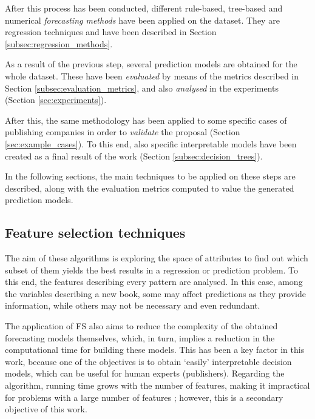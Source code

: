 \documentclass[a4paper,10pt,twocolumn,preprint,3p]{elsarticle}
\begin{document}
After this process has been conducted, different rule-based, tree-based and numerical \textit{forecasting methods} have been applied on the dataset. They are regression techniques and have been described in Section \ref{subsec:regression_methods}.

As a result of the previous step, several prediction models are obtained for the whole dataset. These have been \textit{evaluated} by means of the metrics described in Section \ref{subsec:evaluation_metrics}, and also \textit{analysed} in the experiments (Section \ref{sec:experiments}).

After this, the same methodology has been applied to some specific cases of publishing companies in order to \textit{validate} the proposal (Section \ref{sec:example_cases}). To this end, also specific interpretable models have been created as a final result of the work (Section \ref{subsec:decision_trees}). 

In the following sections, the main techniques to be applied on these steps are described, along with the evaluation metrics computed to value the generated prediction models.

\subsection{Feature selection techniques}
\label{subsec:fs_techniques}

The aim of these algorithms is exploring the space of attributes to find out 
which subset of them yields the best results in a regression or prediction 
problem. To this end, the features describing every pattern are analysed. 
In this case, among the variables describing a new book, some may affect 
predictions as they provide information, while others may not be necessary 
and even redundant.

The application of FS also aims to reduce the complexity of the obtained 
forecasting models themselves, which, in turn, implies a reduction in the 
computational time for building these models. This has been a key 
factor in this work, because one of the objectives is to obtain `easily' 
interpretable decision models, which can be useful for human experts (publishers).
Regarding the algorithm, running time grows with the number of
features, making it impractical for problems with a large number of features 
\cite{Selvakuberan2008}; however, this is a secondary objective of this work.
\end{document}
